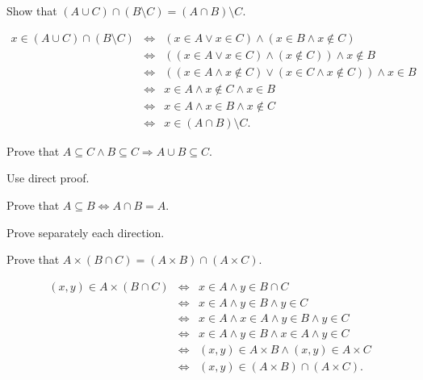 \documentclass[11pt,paper=b5,footinclude,headinclude]{scrbook} %
\theoremstyle{remark}
\theoremstyle{definition} %
\theoremstyle{theorem} %
\newtheorem{ex}{Exercise\hypertarget{sol:\theex}}[chapter]
\begin{document}
\begin{ex}
\end{ex} \begin{ex}Show that $(A\cup C)\cap (B\setminus C) = (A\cap B)\setminus C$.
\begin{sol}
\begin{eqnarray*}
x\in (A\cup C)\cap (B\setminus C) &\Leftrightarrow & (x\in A \vee x\in C) \wedge (x\in B \wedge x\notin C)\\
 &\Leftrightarrow & ((x\in A \vee x\in C) \wedge (x\notin C))\wedge x\notin B\\
&\Leftrightarrow & ((x\in A \wedge x\notin C) \vee (x\in C \wedge x\notin C)) \wedge
 x\in B\\
&\Leftrightarrow & x\in A \wedge x\notin C  \wedge x\in B\\
&\Leftrightarrow & x\in A \wedge x\in B  \wedge x\notin C \\
&\Leftrightarrow & x \in (A\cap B)\setminus C. 
\end{eqnarray*}
\end{sol}

\end{ex}
\begin{ex}Prove that $A\subseteq C  \wedge B\subseteq C \Rightarrow A\cup B\subseteq C$.

\begin{sol}
    Use direct proof.
\end{sol}

\end{ex}
\begin{ex} Prove that $A\subseteq  B \Leftrightarrow A\cap B = A$.

\begin{sol}
    Prove separately each direction.
\end{sol}

\end{ex}
\begin{ex}
Prove that $A\times (B\cap C) = (A\times B)\cap (A\times C)$.


\begin{sol}
    
\begin{eqnarray*}
(x,y)\in A\times (B\cap C) &\Leftrightarrow & x \in A \wedge y\in B\cap C\\
&\Leftrightarrow & x \in A \wedge y\in B  \wedge y\in C\\
&\Leftrightarrow & x \in A \wedge x \in A\wedge y\in B  \wedge y\in C\\
&\Leftrightarrow & x \in A \wedge  y\in B  \wedge x \in A\wedge y\in C\\
&\Leftrightarrow & (x,y) \in A\times B \wedge  (x,y) \in A\times C\\
&\Leftrightarrow & (x,y) \in (A\times B)\cap   (A\times C).
\end{eqnarray*}
\end{sol}

\end{ex} 
\end{document}
